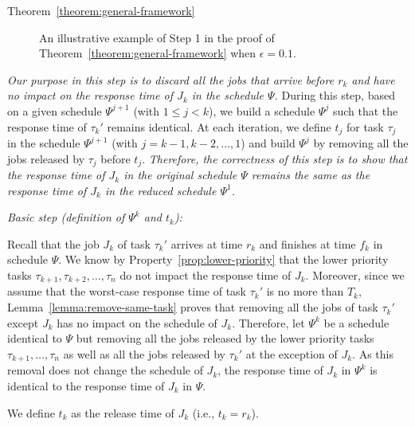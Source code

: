 \begin{appProof}{Theorem~\ref{theorem:general-framework}}


\begin{figure*}[t]
  \centering
\caption{An illustrative example of Step 1 in the proof of Theorem~\ref{theorem:general-framework} when $\epsilon = 0.1$.}
\label{fig:example}  
\end{figure*}



\emph{Our purpose in this step is to discard all the jobs that arrive before $r_k$ and have no impact on the response time of $J_k$ in the schedule
  $\Psi$. } During this step, based on a given schedule $\Psi^{j+1}$ (with $1 \leq j < k$), we build a schedule $\Psi^j$ such that the response time of $\tau_{k}'$ remains identical. At each iteration, we define $t_j$ for task $\tau_j$ in the schedule $\Psi^{j+1}$ (with $j=k-1, k-2, \ldots, 1$) and build $\Psi^j$ by removing all the jobs released by $\tau_j$ before $t_j$. \emph{Therefore, the correctness of this step is to show that the response time of $J_k$ in the original schedule $\Psi$ remains the same as the response time of $J_k$ in  the reduced schedule $\Psi^1$.}


\noindent\textit{Basic step (definition of $\Psi^k$ and $t_k$):} 

Recall that the job $J_{k}$ of task $\tau_k'$ arrives at time $r_k$ and finishes at time $f_k$ in schedule $\Psi$. We know by Property~\ref{prop:lower-priority} that the lower priority tasks $\tau_{k+1}, \tau_{k+2}, \ldots, \tau_n$ do not impact the response time of $J_{k}$. Moreover, since we assume that the worst-case response time of task $\tau_k'$ is no more than $T_k$, Lemma~\ref{lemma:remove-same-task} proves that removing all the jobs of task $\tau_k'$ except $J_{k}$ has no impact on the schedule of $J_{k}$. Therefore, let $\Psi^k$ be a schedule identical to $\Psi$ but removing all the jobs released by the lower priority tasks $\tau_{k+1}, \ldots, \tau_n$ as well as all the jobs released by $\tau_k'$ at the exception of $J_{k}$. As this removal does not change the schedule of $J_k$, the response time of $J_{k}$ in $\Psi^{k}$ is identical to the response time of $J_{k}$ in $\Psi$.

We define $t_k$ as the release time of $J_k$ (i.e., $t_k = r_k$).



\end{appProof}
